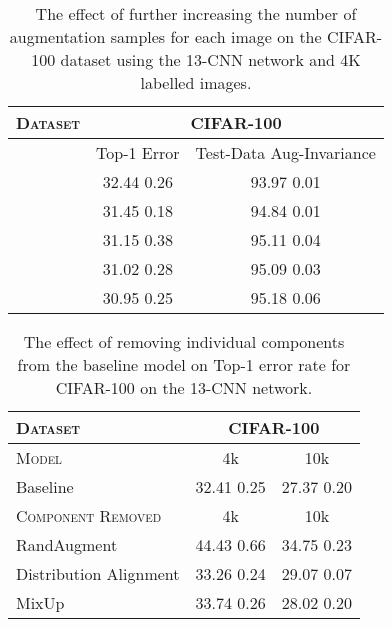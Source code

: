 \documentclass[journal]{IEEEtran}
\begin{document}
\begin{table}[t]
    \centering
    \caption{The effect of further increasing the number of augmentation samples for each image on the CIFAR-100 dataset using the 13-CNN network and 4K labelled images.}
    \begin{tabular}{|l|cc|}
    \hline
    \cellcolor{gray!25} \textsc{Dataset} & \multicolumn{2}{|c|}{\cellcolor{gray!25} \textsc{CIFAR-100}} \\\hline
    \multicolumn{1}{|l|}{\cellcolor{gray!25} \textsc{}} & \cellcolor{gray!25} Top-1 Error &  \multicolumn{1}{c|}{ \cellcolor{gray!25} Test-Data Aug-Invariance} \\ \hline
    \multicolumn{1}{|l|}{} & 32.44  0.26  & 93.97  0.01  \\ \multicolumn{1}{|l|}{} & 31.45  0.18  & 94.84  0.01  \\
    \multicolumn{1}{|l|}{} & 31.15  0.38  & 95.11  0.04  \\
    \multicolumn{1}{|l|}{} & 31.02  0.28  & 95.09  0.03  \\
    \multicolumn{1}{|l|}{} & 30.95  0.25 & 95.18  0.06  \\
    \hline
    \end{tabular}
    \label{tab:ablation-further}
\end{table}


\begin{table}[t]
    \centering
    \caption{The effect of removing individual components from the baseline model on Top-1 error rate for CIFAR-100 on the 13-CNN network.}
    \begin{tabular}{|l|cc|} 
    \hline
    \textsc{Dataset} \cellcolor{gray!25}& \multicolumn{2}{|c|}{\cellcolor{gray!25} \textsc{CIFAR-100}} \\\hline
    \multicolumn{1}{|l|}{\cellcolor{gray!25} \textsc{Model}} & \cellcolor{gray!25} 4k & \multicolumn{1}{c|}{ \cellcolor{gray!25} 10k} \\ \hline
    \multicolumn{1}{|l|}{Baseline} & 32.41  0.25 & 27.37  0.20  \\ \hline
    \multicolumn{1}{|l|}{\cellcolor{gray!25} \textsc{Component Removed}} & \cellcolor{gray!25} 4k & \multicolumn{1}{c|}{ \cellcolor{gray!25}  10k}  \\ \hline
    \multicolumn{1}{|l|}{RandAugment} & 44.43  0.66 & 34.75  0.23  \\
    \multicolumn{1}{|l|}{Distribution Alignment} & 33.26  0.24 & 29.07  0.07 \\
    \multicolumn{1}{|l|}{MixUp} & 33.74  0.26 & 28.02  0.20  \\  \hline
    \end{tabular}
    \label{tab:ablation-component}
\end{table}
\end{document}
